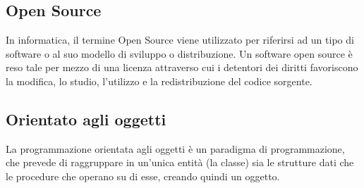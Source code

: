 
\subsection*{Open Source}
In informatica, il termine Open Source viene utilizzato per riferirsi ad un tipo di software o al suo modello di sviluppo o distribuzione. Un software open source è reso tale per mezzo di una licenza attraverso cui i detentori dei diritti favoriscono la modifica, lo studio, l'utilizzo e la redistribuzione del codice sorgente.

\subsection*{Orientato agli oggetti}
La programmazione orientata agli oggetti è un paradigma di programmazione, che prevede di raggruppare in un'unica entità (la classe) sia le strutture dati che le procedure che operano su di esse, creando quindi un oggetto.

